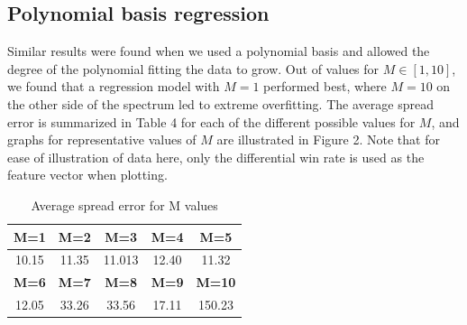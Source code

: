 \documentclass{article}
\begin{document}
\subsection{Polynomial basis regression}

Similar results were found when we used a polynomial basis and allowed the degree of the polynomial fitting the data to grow. Out of values for $M \in [1, 10]$, we found that a regression model with $M=1$ performed best, where $M=10$ on the other side of the spectrum led to extreme overfitting. The average spread error is summarized in Table 4 for each of the different possible values for $M$, and graphs for representative values of $M$ are illustrated in Figure 2. Note that for ease of illustration of data here, only the differential win rate is used as the feature vector when plotting.

\begin{table}
  \begin{center}
    \begin{tabular}{ | c | c | c | c | c | }
      \hline
      \textbf{M=1}    & \textbf{M=2}    & \textbf{M=3}     & \textbf{M=4}     & \textbf{M=5}      \\ \hline
      10.15  & 11.35  & 11.013  & 12.40   & 11.32    \\ \hline
      \textbf{M=6}    & \textbf{M=7}    & \textbf{M=8}     & \textbf{M=9}     & \textbf{M=10}     \\ \hline
      12.05  & 33.26  & 33.56   & 17.11   & 150.23   \\ \hline
    \end{tabular}
  \end{center}
  \caption{Average spread error for M values}
\end{table}
\end{document}
